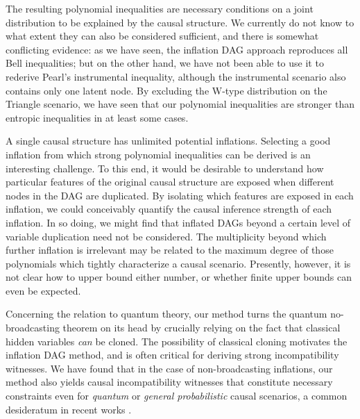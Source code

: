 The resulting polynomial inequalities are necessary conditions on a joint distribution to be explained by the causal structure. We currently do not know to what extent they can also be considered sufficient, and there is somewhat conflicting evidence: as we have seen, the inflation DAG approach reproduces all Bell inequalities; but on the other hand, we have not been able to use it to rederive Pearl's instrumental inequality, although the instrumental scenario also contains only one latent node. By excluding the W-type distribution on the Triangle scenario, we have seen that our polynomial inequalities are stronger than entropic inequalities in at least some cases.


A single causal structure has unlimited potential inflations. Selecting a good inflation from which strong polynomial inequalities can be derived is an interesting challenge. To this end, it would be desirable to understand how particular features of the original causal structure are exposed when different nodes in the DAG are duplicated. By isolating which features are exposed in each inflation, we could conceivably quantify the causal inference strength of each inflation. In so doing, we might find that inflated DAGs beyond a certain level of variable duplication need not be considered. The multiplicity beyond which further inflation is irrelevant may be related to the maximum degree of those polynomials which tightly characterize a causal scenario. Presently, however, it is not clear how to upper bound either number, or whether finite upper bounds can even be expected.

Concerning the relation to quantum theory, our method turns the quantum no-broadcasting theorem \cite{NoCloningQuantum1996,NoCloningGeneral2006} on its head by crucially relying on the fact that classical hidden variables \emph{can} be cloned. The possibility of classical cloning motivates the inflation DAG method, and is often critical for deriving strong incompatibility witnesses. We have found that in the case of non-broadcasting inflations, our method also yields causal incompatibility witnesses that constitute necessary constraints even for \emph{quantum} or \emph{general probabilistic} causal scenarios, a common desideratum in recent works \cite{fritz2012bell,pusey2014gdag,Chaves2015infoquantum,ChavesNoSignalling,BeyondBellII}. 

